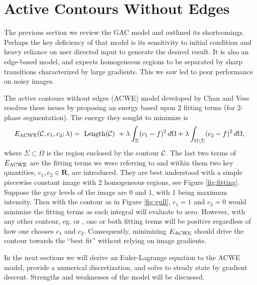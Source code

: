\chapter{Active Contours Without Edges}
\label{ch:acwe}
The previous section we review the GAC model and outlined its shortcomings. Perhaps the key deficiency of that model is its sensitivity to initial condition and heavy reliance on user directed input to generate the desired result. It is also an edge-based model, and expects homogeneous regions to be separated by sharp transitions characterized by large gradients. This we saw led to poor performance on noisy images.

The active contours without edges (ACWE) model developed by Chan and Vese \cite{chan2001active} resolves these issues by proposing an energy based upon 2 fitting terms (for 2-phase segmentation). The energy they sought to minimize is 
\begin{align}
E_\textrm{ACWE}(\mathcal{C}, c_1, c_2; \lambda)
= \textrm{ Length($\mathcal{C}$) } 
+ \lambda \int_{\Sigma} (c_1 - f )^2 \,d\Omega
+ \lambda \int_{\Omega \setminus \Sigma} (c_2 - f )^2 \,d\Omega,
\label{eq:acwe_e}
\end{align}
where $\Sigma \subset \Omega$ is the region enclosed by the contour $\mathcal{C}$.
The last two terms of $E_\textrm{ACWE}$ are the fitting terms we were referring to and within them two key quantities, $c_1, c_2 \in \mathbf{R}$, are introduced. They are best understood with a simple piecewise constant image with 2 homogeneous regions, see Figure \ref{fig:fitting}. Suppose the gray levels of the image are 0 and 1, with 1 being maximum intensity. Then with the contour as in Figure \ref{fig:gull}, $c_1 = 1$ and $c_2 = 0$ would minimize the fitting terms as each integral will evaluate to zero. However, with any other contour, eg.  or , one or both fitting terms will be positive regardless of how one chooses $c_1$ and $c_2$. Consequently, minimizing $E_\textrm{ACWE}$ should drive the contour towards the ``best fit'' without relying on image gradients.

In the next sections we will derive an Euler-Lagrange equation to the ACWE model, provide a numerical discretization, and solve to steady state by gradient descent. Strengths and weaknesses of the model will be discussed.

